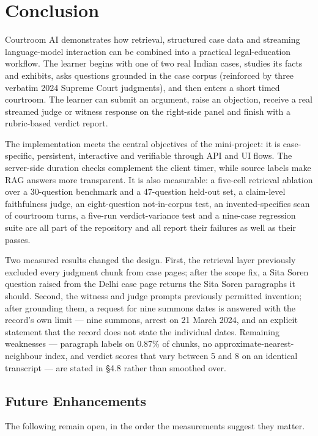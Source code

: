 \documentclass[12pt]{article}
\begin{document}
\section{Conclusion}
Courtroom AI demonstrates how retrieval, structured case data and streaming language-model interaction can be combined into a practical legal-education workflow. The learner begins with one of two real Indian cases, studies its facts and exhibits, asks questions grounded in the case corpus (reinforced by three verbatim 2024 Supreme Court judgments), and then enters a short timed courtroom. The learner can submit an argument, raise an objection, receive a real streamed judge or witness response on the right-side panel and finish with a rubric-based verdict report.

The implementation meets the central objectives of the mini-project: it is case-specific, persistent, interactive and verifiable through API and UI flows. The server-side duration checks complement the client timer, while source labels make RAG answers more transparent. It is also measurable: a five-cell retrieval ablation over a 30-question benchmark and a 47-question held-out set, a claim-level faithfulness judge, an eight-question not-in-corpus test, an invented-specifics scan of courtroom turns, a five-run verdict-variance test and a nine-case regression suite are all part of the repository and all report their failures as well as their passes.

Two measured results changed the design. First, the retrieval layer previously excluded every judgment chunk from case pages; after the scope fix, a Sita Soren question raised from the Delhi case page returns the Sita Soren paragraphs it should. Second, the witness and judge prompts previously permitted invention; after grounding them, a request for nine summons dates is answered with the record's own limit --- nine summons, arrest on 21 March 2024, and an explicit statement that the record does not state the individual dates. Remaining weaknesses --- paragraph labels on 0.87\% of chunks, no approximate-nearest-neighbour index, and verdict scores that vary between 5 and 8 on an identical transcript --- are stated in \S4.8 rather than smoothed over.


\subsection{Future Enhancements}
The following remain open, in the order the measurements suggest they matter.
\end{document}
